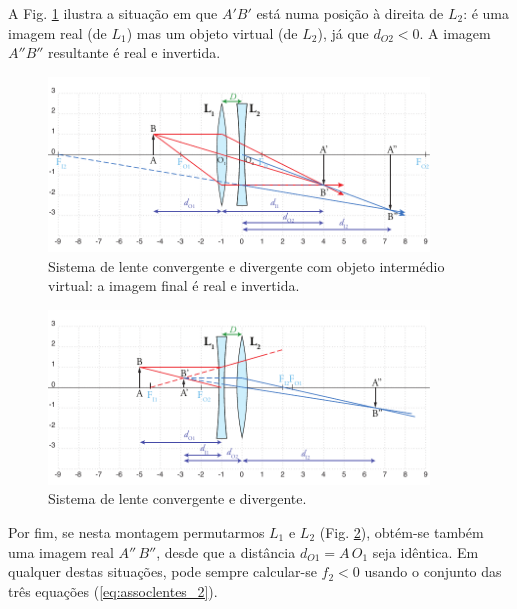 \documentclass[12pt,a4paper,oneside]{paper}
\begin{document}
A Fig. \ref{fig:DuplaConvDiv2} ilustra a situação em que $A'B'$ está numa posição à direita de $L_2$: é uma imagem real
(de $L_1$) mas um objeto virtual (de $L_2$), já que $d_{O2}<0$. A imagem $A''B''$ resultante é real e invertida.

\begin{figure}[H] 
\begin{center}
	\includegraphics[width=0.9\textwidth]{./otica_images/12-DuplaConvDiv2}
	\caption{Sistema de lente convergente e divergente com objeto intermédio virtual: a imagem final é real e invertida. 
    \label{fig:DuplaConvDiv2}} 
\end{center}
\end{figure}

\begin{figure}[H]  
\begin{center}
	\includegraphics[width=0.9\textwidth]{./otica_images/13-DuplaConvDiv3}
\end{center}
	\caption{Sistema de lente convergente e divergente.  \label{fig:DuplaConvDiv3}} 
\end{figure}


Por fim, se nesta montagem permutarmos $L_1$ e $L_2$ (Fig. \ref{fig:DuplaConvDiv3}), obtém-se também uma imagem real  $A''\,B''$, desde que a distância $d_{O1}=A\,O_1$ seja idêntica.
Em qualquer destas situações, pode sempre calcular-se $f_2 < 0$ usando o conjunto das três equações (\ref{eq:assoclentes_2}).
\clearpage
\end{document}
